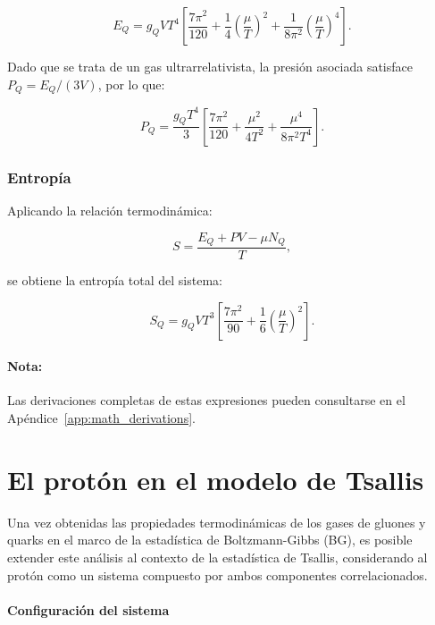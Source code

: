 \begin{equation}\label{eq-FD-Energy}
E_Q = g_Q V T^4 \left[
\frac{7 \pi^2}{120} + \frac{1}{4} \left( \frac{\mu}{T} \right)^2 + \frac{1}{8 \pi^2} \left( \frac{\mu}{T} \right)^4
\right].
\end{equation}

Dado que se trata de un gas ultrarrelativista, la presión asociada satisface \( P_Q = E_Q / (3V) \), por lo que:

\begin{equation}
P_Q = \frac{g_Q T^4}{3} \left[
\frac{7 \pi^2}{120} + \frac{\mu^2}{4 T^2} + \frac{\mu^4}{8 \pi^2 T^4}
\right].
\end{equation}


\subsubsection*{Entropía}

Aplicando la relación termodinámica:

\[
S = \frac{{E}_{Q} + P V - \mu {N}_{Q}}{T},
\]

se obtiene la entropía total del sistema:

\begin{equation}\label{eq-FD-Entropy}
S_Q = g_Q V T^3 \left[
\frac{7 \pi^2}{90} + \frac{1}{6} \left( \frac{\mu}{T} \right)^2
\right].
\end{equation}

\paragraph{Nota:} Las derivaciones completas de estas expresiones pueden consultarse en el Apéndice~\ref{app:math_derivations}.


\section{El protón en el modelo de Tsallis}
\label{sec-proton-tsallis}

Una vez obtenidas las propiedades termodinámicas de los gases de gluones y quarks en el marco de la estadística de Boltzmann-Gibbs (BG), es posible extender este análisis al contexto de la estadística de Tsallis, considerando al protón como un sistema compuesto por ambos componentes correlacionados.

\paragraph{Configuración del sistema}

